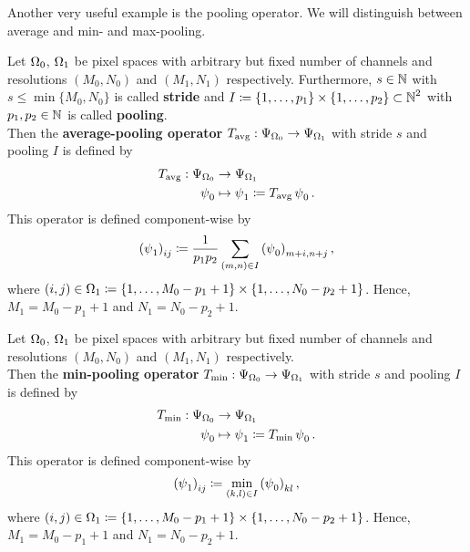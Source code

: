 Another very useful example is the pooling operator. We will distinguish between average and min- and max-pooling.

\begin{definition}\label{def:avg_pooling_op}
Let $\Omega_0$, $\Omega_1$ be pixel spaces with arbitrary but fixed number of channels and resolutions $(M_0,N_0)$ and $(M_1,N_1)$ respectively. Furthermore, $s\in\operatorname{\mathbb{N}}$ with $s\leq \min\{M_0,N_0\}$ is called \textbf{stride} and $I\coloneqq \{1,\ldots,p_1\}\times \{1,\ldots,p_2\} \subset\operatorname{\mathbb{N}}^2$ with $p_1,p_2\in\operatorname{\mathbb{N}}$ is called \textbf{pooling}.\\
Then the \textbf{average-pooling operator} $T_{\text{avg}}: \Psi_{\Omega_0} \to \Psi_{\Omega_1}$ with stride $s$ and pooling $I$ is defined by
\begin{align*}
T_{\text{avg}}: \Psi_{\Omega_0} &\to \Psi_{\Omega_1}\\
\operatorname{\psi}_0 &\mapsto \operatorname{\psi}_1 \coloneqq T_{\text{avg}}\operatorname{\psi}_0 .
\end{align*}
This operator is defined component-wise by
\begin{align}
\left(\operatorname{\psi}_1\right)_{ij} \coloneqq  \frac{1}{p_1p_2} \sum_{(m,n)\in I}\left(\operatorname{\psi}_0\right)_{m+i, n+j},
\end{align}
where $(i,j) \in \Omega_1 \coloneqq \{1,\ldots, M_0-p_1+1\} \times \{1,\ldots, N_0-p_2+1\}$. Hence, $M_1 = M_0-p_1+1$ and $N_1 = N_0-p_2+1$.
\end{definition}

\begin{definition}\label{def:min_pooling_op}
Let $\Omega_0$, $\Omega_1$ be pixel spaces with arbitrary but fixed number of channels and resolutions $(M_0,N_0)$ and $(M_1,N_1)$ respectively.\\
Then the \textbf{min-pooling operator} $T_{\text{min}}: \Psi_{\Omega_0} \to \Psi_{\Omega_1}$ with stride $s$ and pooling $I$ is defined by
\begin{align*}
T_{\text{min}}: \Psi_{\Omega_0} &\to \Psi_{\Omega_1} \\
\operatorname{\psi}_0 &\mapsto \operatorname{\psi}_1 \coloneqq T_{\text{min}}\operatorname{\psi}_0 .
\end{align*}
This operator is defined component-wise by
\begin{align}
\left(\operatorname{\psi}_1\right)_{ij} \coloneqq  \min_{(k,l)\in I} \left(\operatorname{\psi}_0\right)_{kl},
\end{align}
where $(i,j) \in \Omega_1 \coloneqq \{1,\ldots, M_0-p_1+1\} \times \{1,\ldots, N_0-p_2+1\}$. Hence, $M_1 = M_0-p_1+1$ and $N_1 = N_0-p_2+1$.
\end{definition}

